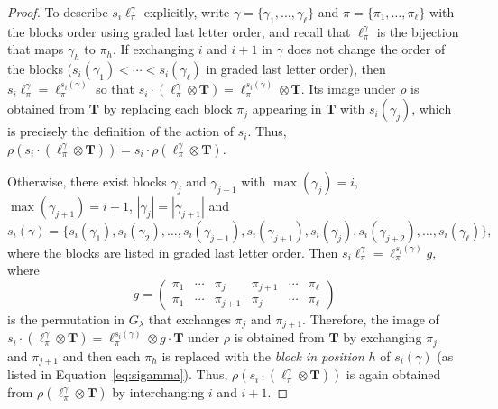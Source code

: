 \documentclass[ALCO,Unicode]{cedram}
\begin{document}
\begin{proof}
To describe $s_i \ell_\pi^\gamma$ explicitly, write
$\gamma = \{\gamma_1, \ldots, \gamma_\ell\}$ and $\pi = \{\pi_1, \ldots, \pi_\ell\}$
with the blocks order using graded last letter order,
and recall that $\ell_\pi^\gamma$ is the bijection that maps $\gamma_h$ to $\pi_h$.
If exchanging $i$ and $i+1$ in $\gamma$ does not change the order of the
blocks (\ie $s_i(\gamma_1) < \cdots < s_i(\gamma_\ell)$ in
graded last letter order), then $s_i \ell_\pi^\gamma = \ell_\pi^{s_i(\gamma)}$
so that $s_i \cdot (\ell_\pi^\gamma \otimes \mathbf{T})
= \ell_\pi^{s_i(\gamma)} \otimes \mathbf{T}$.
Its image under $\rho$ is obtained from $\mathbf{T}$ by replacing each block
$\pi_j$ appearing in $\mathbf{T}$ with $s_i(\gamma_j)$,
which is precisely the definition of the action of $s_i$.
Thus, $\rho(s_i \cdot (\ell_\pi^\gamma \otimes \mathbf{T})) = s_i \cdot \rho(\ell_\pi^\gamma \otimes \mathbf{T})$.

Otherwise, there exist blocks $\gamma_{j}$ and $\gamma_{j+1}$ with
$\max(\gamma_{j}) = i$, $\max(\gamma_{j+1}) = i+1$,
$|\gamma_j| = |\gamma_{j+1}|$ and
\begin{equation} \label{eq:sigamma}
    s_i(\gamma) = \big\{
        s_i(\gamma_1), s_i(\gamma_2), \ldots,
        s_i(\gamma_{j-1}), s_i(\gamma_{j+1}), s_i(\gamma_{j}), s_i(\gamma_{j+2}), \ldots, s_i(\gamma_\ell)
        \big\},
\end{equation}
where the blocks are listed in graded last letter order.
Then $s_i \ell_\pi^\gamma = \ell_\pi^{s_i(\gamma)} g$, where
\[
g = \begin{pmatrix} \pi_1&\cdots&\pi_j&\pi_{j+1}&\cdots&\pi_{\ell}\\
\pi_1&\cdots&\pi_{j+1}&\pi_j&\cdots&\pi_{\ell}\end{pmatrix}
\]
is the permutation in $G_\lambda$ that exchanges $\pi_{j}$ and $\pi_{j+1}$.
Therefore, the image of
$s_i \cdot (\ell_\pi^\gamma \otimes \mathbf{T}) = \ell_\pi^{s_i(\gamma)} \otimes g \cdot \mathbf{T}$
under $\rho$ is obtained from $\mathbf{T}$ by exchanging $\pi_j$ and $\pi_{j+1}$
and then each $\pi_{h}$ is replaced with the \emph{block in position} $h$ of $s_i(\gamma)$
(as listed in Equation~\eqref{eq:sigamma}).
Thus, $\rho(s_i \cdot (\ell_\pi^\gamma \otimes \mathbf{T}))$ is
again obtained from $\rho(\ell_\pi^\gamma \otimes \mathbf{T})$
by interchanging $i$ and $i+1$.
\end{proof}
\end{document}
